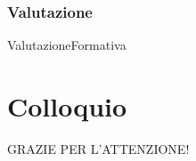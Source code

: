 \documentclass[italian]{beamer}
\begin{document}
\section[Valutazione]{Valutazione}

\begin{frame}{Valutazione}{Formativa}

\end{frame}


\part[Colloquio]{Colloquio}

\begin{frame}[plain]
	
	\vfill
	
	\begin{center}
		{\Large GRAZIE PER L'ATTENZIONE!}
	\end{center}
	
	\vfill
	
\end{frame}
\end{document}
